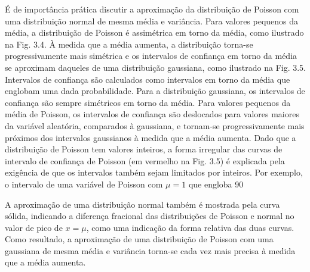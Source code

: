É de importância prática discutir a aproximação da distribuição de Poisson com uma distribuição normal de mesma média e variância. Para valores pequenos da média, a distribuição de Poisson é assimétrica em torno da média, como ilustrado na Fig. 3.4. À medida que a média aumenta, a distribuição torna-se progressivamente mais simétrica e os intervalos de confiança em torno da média se aproximam daqueles de uma distribuição gaussiana, como ilustrado na Fig. 3.5. Intervalos de confiança são calculados como intervalos em torno da média que englobam uma dada probabilidade. Para a distribuição gaussiana, os intervalos de confiança são sempre simétricos em torno da média. Para valores pequenos da média de Poisson, os intervalos de confiança são deslocados para valores maiores da variável aleatória, comparados à gaussiana, e tornam-se progressivamente mais próximos dos intervalos gaussianos à medida que a média aumenta. Dado que a distribuição de Poisson tem valores inteiros, a forma irregular das curvas de intervalo de confiança de Poisson (em vermelho na Fig. 3.5) é explicada pela exigência de que os intervalos também sejam limitados por inteiros. Por exemplo, o intervalo de uma variável de Poisson com \( \mu = 1 \) que engloba 90%

A aproximação de uma distribuição normal também é mostrada pela curva sólida, indicando a diferença fracional das distribuições de Poisson e normal no valor de pico de \( x = \mu \), como uma indicação da forma relativa das duas curvas. Como resultado, a aproximação de uma distribuição de Poisson com uma gaussiana de mesma média e variância torna-se cada vez mais precisa à medida que a média aumenta.